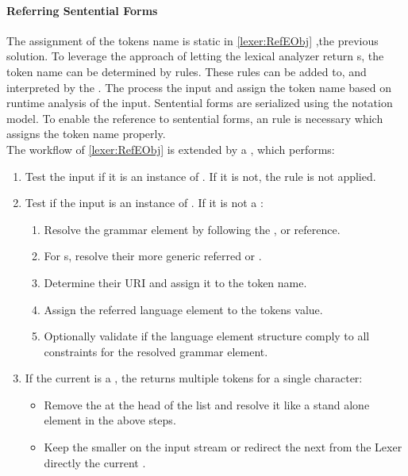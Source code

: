 \paragraph{Referring Sentential Forms}
The assignment of the tokens name is  static in \ref{lexer:RefEObj} ,the previous solution. To leverage the approach of letting the lexical analyzer return s, the token name can be determined by rules. These rules can be added to, and interpreted by the . The  process the input  and assign the token name based on runtime analysis of the input. Sentential forms are serialized using the notation model. To enable the reference to sentential forms, an  rule is necessary which assigns the token name properly. \\
The workflow of \ref{lexer:RefEObj} is extended by a , which performs:
\begin{enumerate}
	\item Test the input  if it is an instance of . If it is not, the rule is not applied.
	\item Test if the input is an instance of . 
	If it is not a :
	\begin{enumerate}
		\item Resolve the grammar element by following the ,  or  reference. 
		\item For s, resolve their more generic referred  or .
		\item Determine their URI and assign it to the token name.
		\item Assign the referred language element  to the tokens value.
		\item Optionally validate if the language element structure comply to all constraints for the resolved grammar element.
	\end{enumerate}
	\item If the current  is a , the  returns multiple tokens for a single character:
	\begin{itemize}
		\item Remove the  at the head of the list and resolve it like a stand alone element in the above steps.
		\item Keep the smaller  on the input stream or redirect the next  from the Lexer directly the current .  \\
	\end{itemize}
\end{enumerate}

